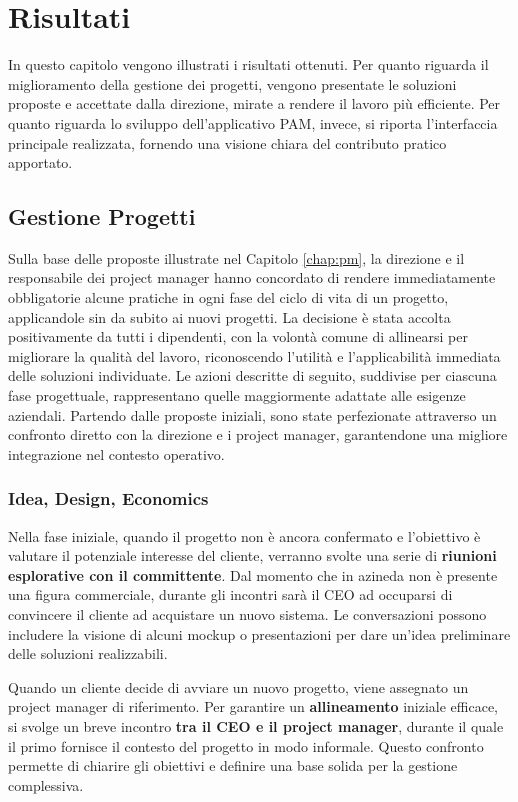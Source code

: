 \chapter{Risultati}
\label{chap:Results}

In questo capitolo vengono illustrati i risultati ottenuti. Per quanto riguarda il miglioramento
della gestione dei progetti, vengono presentate le soluzioni proposte e accettate dalla direzione,
mirate a rendere il lavoro più efficiente. Per quanto riguarda lo sviluppo dell’applicativo \ac{PAM},
invece, si riporta l’interfaccia principale realizzata, fornendo una visione chiara del contributo
pratico apportato.

\section{Gestione Progetti}
Sulla base delle proposte illustrate nel Capitolo \ref{chap:pm}, la direzione e il responsabile dei
project manager hanno concordato di rendere immediatamente obbligatorie alcune pratiche in ogni fase
del ciclo di vita di un progetto, applicandole sin da subito ai nuovi progetti.
La decisione è stata accolta positivamente da tutti i dipendenti, con la volontà comune di allinearsi per migliorare
la qualità del lavoro, riconoscendo l’utilità e l’applicabilità immediata delle soluzioni individuate.
Le azioni descritte di seguito, suddivise per ciascuna fase progettuale, rappresentano quelle maggiormente adattate
alle esigenze aziendali. Partendo dalle proposte iniziali, sono state perfezionate attraverso un confronto diretto
con la direzione e i project manager, garantendone una migliore integrazione nel contesto operativo.

    \subsection{Idea, Design, Economics}
    Nella fase iniziale, quando il progetto non è ancora confermato e l'obiettivo è valutare il potenziale interesse
    del cliente, verranno svolte una serie di \textbf{riunioni esplorative con il committente}.
    Dal momento che in azineda non è presente una figura commerciale, durante gli incontri sarà il CEO ad occuparsi
    di convincere il cliente ad acquistare un nuovo sistema. Le conversazioni
    possono includere la visione di alcuni mockup o presentazioni per dare un'idea preliminare delle soluzioni realizzabili.

    Quando un cliente decide di avviare un nuovo progetto, viene assegnato un project manager di riferimento.
    Per garantire un \textbf{allineamento} iniziale efficace, si svolge un breve incontro \textbf{tra il CEO e il project manager},
    durante il quale il primo fornisce il contesto del progetto in modo informale.
    Questo confronto permette di chiarire gli obiettivi e definire una base solida per la gestione complessiva.


